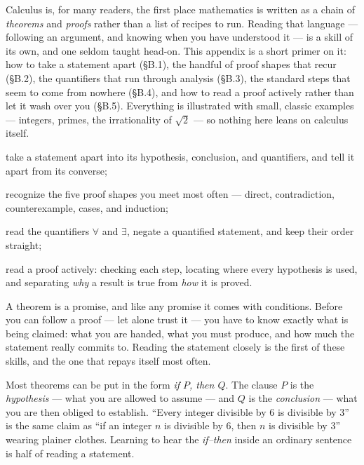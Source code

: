 \documentclass[a4paper,12pt,oneside]{memoir}
\begin{document}

\begin{lead}
Calculus is, for many readers, the first place mathematics is written as a chain of \emph{theorems} and \emph{proofs} rather than a list of recipes to run. Reading that language — following an argument, and knowing when you have understood it — is a skill of its own, and one seldom taught head-on. This appendix is a short primer on it: how to take a statement apart (§B.1), the handful of proof shapes that recur (§B.2), the quantifiers that run through analysis (§B.3), the standard steps that seem to come from nowhere (§B.4), and how to read a proof actively rather than let it wash over you (§B.5). Everything is illustrated with small, classic examples — integers, primes, the irrationality of \(\sqrt{2}\) — so nothing here leans on calculus itself.
\end{lead}

\begin{objectives}
  \item take a statement apart into its hypothesis, conclusion, and quantifiers, and tell it apart from its converse;
  \item recognize the five proof shapes you meet most often — direct, contradiction, counterexample, cases, and induction;
  \item read the quantifiers \(\forall\) and \(\exists\), negate a quantified statement, and keep their order straight;
  \item read a proof actively: checking each step, locating where every hypothesis is used, and separating \emph{why} a result is true from \emph{how} it is proved.
\end{objectives}


A theorem is a promise, and like any promise it comes with conditions. Before you can follow a proof — let alone trust it — you have to know exactly what is being claimed: what you are handed, what you must produce, and how much the statement really commits to. Reading the statement closely is the first of these skills, and the one that repays itself most often.

Most theorems can be put in the form \emph{if \(P\), then \(Q\)}. The clause \(P\) is the \emph{hypothesis} — what you are allowed to assume — and \(Q\) is the \emph{conclusion} — what you are then obliged to establish. “Every integer divisible by \(6\) is divisible by \(3\)” is the same claim as “if an integer \(n\) is divisible by \(6\), then \(n\) is divisible by \(3\)” wearing plainer clothes. Learning to hear the \emph{if–then} inside an ordinary sentence is half of reading a statement.
\end{document}
